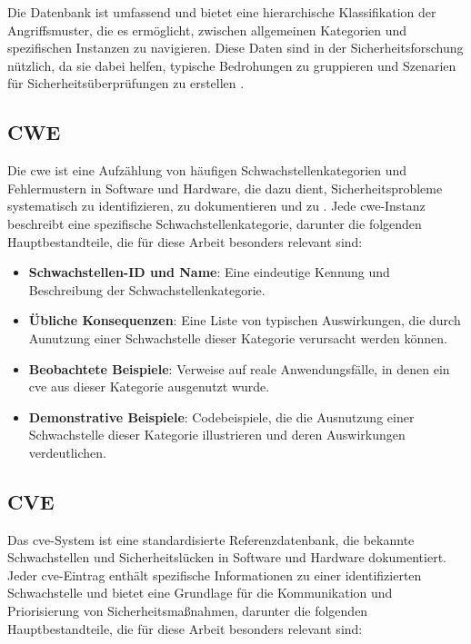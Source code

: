 Die Datenbank ist umfassend und bietet eine hierarchische Klassifikation der Angriffsmuster, die es ermöglicht, zwischen allgemeinen Kategorien und spezifischen Instanzen zu navigieren. Diese Daten sind in der Sicherheitsforschung nützlich, da sie dabei helfen, typische Bedrohungen zu gruppieren und Szenarien für Sicherheitsüberprüfungen zu erstellen \autocite{CAPECCAPEC}.

\subsection{CWE}
\label{bg:cwe}
Die \gls{cwe} ist eine Aufzählung von häufigen Schwachstellenkategorien und Fehlermustern in Software und Hardware, die dazu dient, Sicherheitsprobleme systematisch zu identifizieren, zu dokumentieren und zu \autocite{CWECWE}. Jede \gls{cwe}-Instanz beschreibt eine spezifische Schwachstellenkategorie, darunter die folgenden Hauptbestandteile, die für diese Arbeit besonders relevant sind:

\begin{itemize}
    \item \textbf{Schwachstellen-ID und Name}: Eine eindeutige Kennung und Beschreibung der Schwachstellenkategorie.
    \item \textbf{Übliche Konsequenzen}: Eine Liste von typischen Auswirkungen, die durch Aunutzung einer Schwachstelle dieser Kategorie verursacht werden können.
    \item \textbf{Beobachtete Beispiele}: Verweise auf reale Anwendungsfälle, in denen ein \gls{cve} aus dieser Kategorie ausgenutzt wurde.
    \item \textbf{Demonstrative Beispiele}: Codebeispiele, die die Ausnutzung einer Schwachstelle dieser Kategorie illustrieren und deren Auswirkungen verdeutlichen.
\end{itemize}

\subsection{CVE}
\label{bg:cve}
Das \gls{cve}-System ist eine standardisierte Referenzdatenbank, die bekannte Schwachstellen und Sicherheitslücken in Software und Hardware dokumentiert. Jeder \gls{cve}-Eintrag enthält spezifische Informationen zu einer identifizierten Schwachstelle und bietet eine Grundlage für die Kommunikation und Priorisierung von Sicherheitsmaßnahmen, darunter die folgenden Hauptbestandteile, die für diese Arbeit besonders relevant sind:

